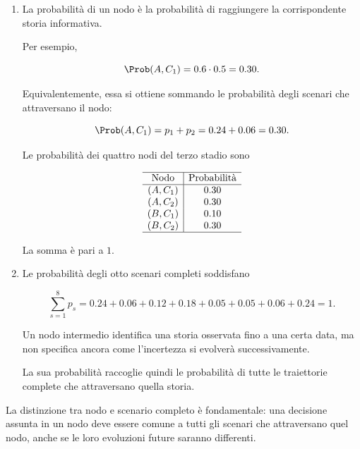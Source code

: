 \begin{enumerate}
\item La probabilit\`a di un nodo
\`e la probabilit\`a di raggiungere
la corrispondente storia informativa.

Per esempio,

\[
\Prob(A,C_1)
=
0.6\cdot0.5
=
0.30.
\]

Equivalentemente, essa si ottiene
sommando le probabilit\`a
degli scenari che attraversano il nodo:

\[
\Prob(A,C_1)
=
p_1+p_2
=
0.24+0.06
=
0.30.
\]

Le probabilit\`a dei quattro nodi
del terzo stadio sono

\[
\begin{array}{c|c}
\hline
\text{Nodo}
&
\text{Probabilit\`a}\\
\hline
(A,C_1)&0.30\\
(A,C_2)&0.30\\
(B,C_1)&0.10\\
(B,C_2)&0.30\\
\hline
\end{array}
\]

La somma \`e pari a $1$.

\item Le probabilit\`a
degli otto scenari completi soddisfano

\[
\sum_{s=1}^{8}p_s
=
0.24+0.06+0.12+0.18
+0.05+0.05+0.06+0.24
=
1.
\]

Un nodo intermedio identifica
una storia osservata fino a una certa data,
ma non specifica ancora
come l'incertezza si evolver\`a
successivamente.

La sua probabilit\`a raccoglie quindi
le probabilit\`a di tutte
le traiettorie complete che attraversano
quella storia.

\end{enumerate}

La distinzione tra nodo e scenario completo
\`e fondamentale: una decisione assunta
in un nodo deve essere comune
a tutti gli scenari che attraversano
quel nodo, anche se le loro evoluzioni
future saranno differenti.



